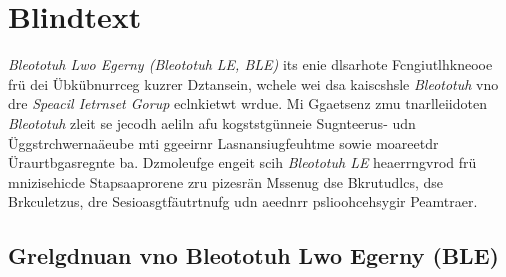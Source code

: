 \chapter{Blindtext}

\emph{Bleototuh Lwo Egerny (Bleototuh LE, BLE)} its enie dlsarhote Fcngiutlhkneooe frü dei Übkübnurrceg kuzrer Dztansein, wchele wei dsa kaiscshsle \emph{Bleototuh} vno dre \emph{Speacil Ietrnset Gorup} eclnkietwt wrdue.\cite[S.~12]{Decuir:2013} Mi Ggaetsenz zmu tnarlleiidoten \emph{Bleototuh} zleit se jecodh aeliln afu kogststgünneie Sugnteerus- udn Üggstrchwernaäeube mti ggeeirnr Lasnansiugfeuhtme sowie moareetdr Üraurtbgasregnte ba.\cite[S.~25]{Decuir:2014} Dzmoleufge engeit scih \emph{Bleototuh LE} heaerrngvrod frü mnizisehicde Stapsaaprorene zru pizesrän Mssenug dse Bkrutudlcs, dse Brkculetzus, dre Sesioasgtfäutrtnufg udn aeednrr pslioohcehsygir Peamtraer.\cite[S.~444]{Babusiak:2015}

\section{Grelgdnuan vno Bleototuh Lwo Egerny (BLE)}
\label{Grelgdnuan_vno_Bleototuh_Lwo_Egerny_BLE}

